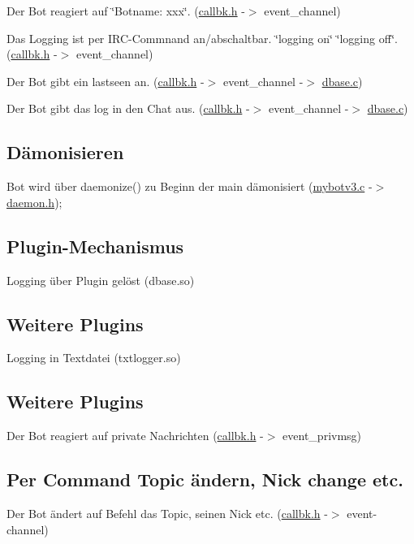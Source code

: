 \begin{DoxyItemize}
\item \-Der \-Bot reagiert auf \char`\"{}\-Botname\-: xxx\char`\"{}. (\hyperlink{callbk_8h}{callbk.\-h} -\/$>$ event\-\_\-channel)
\item \-Das \-Logging ist per \-I\-R\-C-\/\-Commnand an/abschaltbar. \char`\"{}logging on\char`\"{} \char`\"{}logging off\char`\"{}. (\hyperlink{callbk_8h}{callbk.\-h} -\/$>$ event\-\_\-channel)
\item \-Der \-Bot gibt ein lastseen an. (\hyperlink{callbk_8h}{callbk.\-h} -\/$>$ event\-\_\-channel -\/$>$ \hyperlink{dbase_8c}{dbase.\-c})
\item \-Der \-Bot gibt das log in den \-Chat aus. (\hyperlink{callbk_8h}{callbk.\-h} -\/$>$ event\-\_\-channel -\/$>$ \hyperlink{dbase_8c}{dbase.\-c}) 
\end{DoxyItemize}\hypertarget{index_sec2_3}{}\subsection{\-Dämonisieren}\label{index_sec2_3}
\-Bot wird über daemonize() zu \-Beginn der main dämonisiert (\hyperlink{mybotv3_8c}{mybotv3.\-c} -\/$>$ \hyperlink{daemon_8h}{daemon.\-h}); \hypertarget{index_sec2_4}{}\subsection{\-Plugin-\/\-Mechanismus}\label{index_sec2_4}
\-Logging über \-Plugin gelöst (dbase.\-so) \hypertarget{index_sec2_5}{}\subsection{\-Weitere Plugins}\label{index_sec2_5}
\-Logging in \-Textdatei (txtlogger.\-so) \hypertarget{index_sec2_5}{}\subsection{\-Weitere Plugins}\label{index_sec2_5}
\-Der \-Bot reagiert auf private \-Nachrichten (\hyperlink{callbk_8h}{callbk.\-h} -\/$>$ event\-\_\-privmsg) \hypertarget{index_sec2_6}{}\subsection{\-Per Command Topic ändern, Nick change etc.}\label{index_sec2_6}
\-Der \-Bot ändert auf \-Befehl das \-Topic, seinen \-Nick etc. (\hyperlink{callbk_8h}{callbk.\-h} -\/$>$ event-\/channel) 